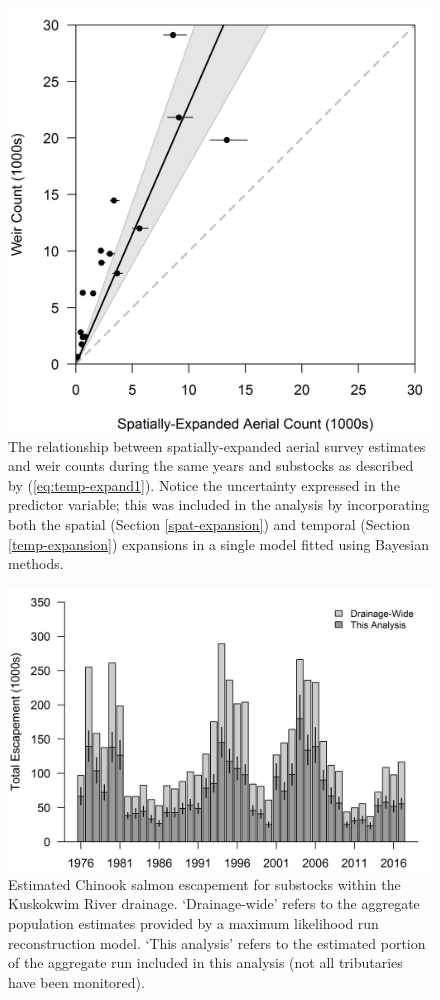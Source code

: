 \documentclass[12pt,]{book}
\theoremstyle{definition}
\theoremstyle{definition}
\theoremstyle{definition}
\theoremstyle{remark}
\begin{document}
\begin{figure}
  \centering
  \includegraphics{img/Ch4/obs-correct.png}
  \caption{The relationship between spatially-expanded aerial survey estimates and weir counts during the same years and substocks as described by (\ref{eq:temp-expand1}). Notice the uncertainty expressed in the predictor variable; this was included in the analysis by incorporating both the spatial (Section \ref{spat-expansion}) and temporal (Section \ref{temp-expansion}) expansions in a single model fitted using Bayesian methods.}
  \label{fig:obs-correct}
\end{figure}

\clearpage

\begin{figure}
  \centering
  \includegraphics{img/Ch4/obs-fraction.png}
  \caption{Estimated Chinook salmon escapement for substocks within the Kuskokwim River drainage. `Drainage-wide' refers to the aggregate population estimates provided by a maximum likelihood run reconstruction model. `This analysis' refers to the estimated portion of the aggregate run included in this analysis (not all tributaries have been monitored).}
  \label{fig:obs-fraction}
\end{figure}


\end{document}

